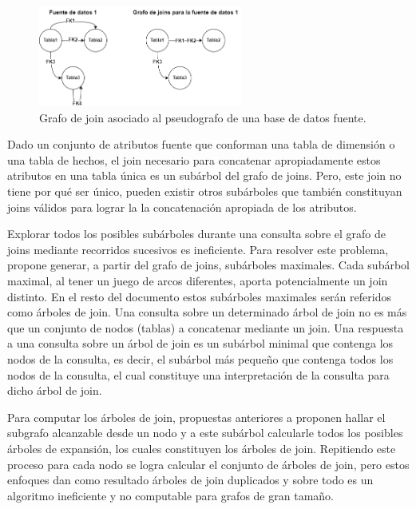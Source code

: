 \begin{figure}[H]
    \centering
    \includegraphics[width=0.60\textwidth]{Graphics/graph join transformation.drawio.png}
    \caption{Grafo de join asociado al pseudografo de una base de datos fuente.}
    \label{fig:joingraphobtention}
\end{figure}

Dado un conjunto de atributos fuente que conforman una tabla de dimensión o una tabla de hechos, el join necesario 
para concatenar apropiadamente estos atributos en una tabla \'unica es un sub\'arbol del grafo de joins. Pero, este join no tiene 
por qu\'e ser \'unico, pueden existir otros sub\'arboles que también constituyan joins válidos para lograr 
la la concatenación apropiada de los atributos. 

Explorar todos los posibles sub\'arboles durante una consulta sobre el grafo de joins mediante 
recorridos sucesivos es ineficiente. Para resolver este problema, \cite{mason2005autojoin} propone 
generar, a partir del grafo de joins, sub\'arboles maximales. Cada sub\'arbol maximal, al tener un juego 
de arcos diferentes, aporta potencialmente un join distinto. En el resto del documento estos sub\'arboles 
maximales ser\'an referidos como \'arboles de join. Una consulta sobre un determinado \'arbol de join no es m\'as que 
un conjunto de nodos (tablas) a concatenar mediante un join. Una respuesta a una consulta sobre un \'arbol de join es un sub\'arbol 
minimal que contenga los nodos de la consulta, es decir, el subárbol m\'as pequeño que contenga todos los nodos 
de la consulta, el cual constituye una interpretación 
de la consulta para dicho \'arbol de join.

Para computar los \'arboles de join, propuestas anteriores a \cite{mason2005autojoin} proponen hallar 
el subgrafo alcanzable desde un nodo y a este sub\'arbol calcularle todos los posibles \'arboles de 
expansión, los cuales constituyen los \'arboles de join. Repitiendo este proceso para 
cada nodo se logra 
calcular el conjunto de \'arboles de join, 
pero estos enfoques dan como resultado \'arboles de join duplicados y sobre todo 
es un algoritmo ineficiente y no computable para grafos de gran tamaño\cite{mason2005autojoin}.

